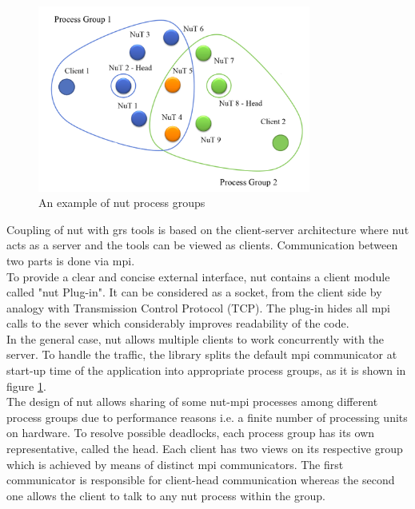 \figpointer{\ref{fig:introduction-nut-process-groups}}
\begin{figure}[htpb]
  \centering
  \includegraphics[width=0.8\textwidth]{figures/introduction-nut-process-groups.png}
\caption{An example of \acrshort{nut} process groups}
\label{fig:introduction-nut-process-groups}
\end{figure}

Coupling of \acrshort{nut} with \acrshort{grs} tools is based on the client-server architecture where \acrshort{nut} acts as a server and the tools can be viewed as clients. Communication between two parts is done via \acrshort{mpi}.\\


To provide a clear and concise external interface, \acrshort{nut} contains a client module called "\acrshort{nut} Plug-in". It can be  considered as a socket, from the client side by analogy with Transmission Control Protocol (TCP). The plug-in hides all \acrshort{mpi} calls to the sever which considerably improves readability of the code.\\


In the general case, \acrshort{nut} allows multiple clients to work concurrently with the server. To handle the traffic, the library splits the default \acrshort{mpi} communicator at start-up time of the application into appropriate process groups, as it is shown in figure \ref{fig:introduction-nut-process-groups}.\\



The design of \acrshort{nut} allows sharing of some \acrshort{nut}-\acrshort{mpi} processes among different process groups due to performance reasons i.e. a finite number of processing units on hardware. To resolve possible deadlocks, each process group has its own representative, called the head. Each client has two views on its respective group which is achieved by means of distinct \acrshort{mpi} communicators. The first communicator is responsible for client-head communication whereas the second one allows the client to talk to any \acrshort{nut} process within the group.\\



